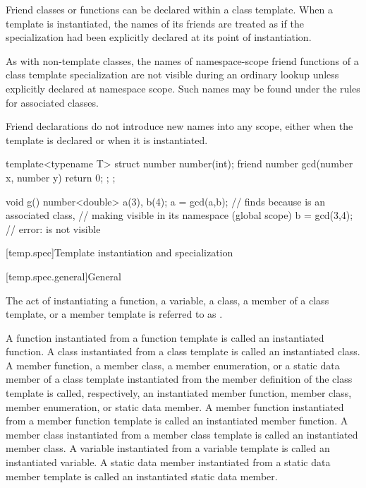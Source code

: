 \pnum
Friend classes or functions can be declared within a class template.
When a template is instantiated, the names of its friends are treated
as if the specialization had been explicitly declared at its point of
instantiation.

\pnum
As with non-template classes, the names of namespace-scope friend
functions of a class template specialization are not visible during
an ordinary lookup unless explicitly declared at namespace scope.
Such names may be found under the rules for associated
classes.
\begin{footnote}
Friend declarations do not
introduce new names into any scope, either
when the template is declared or when it is instantiated.
\end{footnote}
\begin{example}
\begin{codeblock}
template<typename T> struct number {
  number(int);
  friend number gcd(number x, number y) { return 0; };
};

void g() {
  number<double> a(3), b(4);
  a = gcd(a,b);     // finds  because  is an associated class,
                    // making  visible in its namespace (global scope)
  b = gcd(3,4);     // error:  is not visible
}
\end{codeblock}
\end{example}

[temp.spec]{Template instantiation and specialization}

[temp.spec.general]{General}

\pnum
{}%
The act of instantiating a function, a variable,
a class, a member of a class template, or
a member template is referred to as
.

\pnum
A function instantiated from a function template is called an instantiated
function.
A class instantiated from a class template is called an instantiated class.
A member function, a member class, a member enumeration, or a static data member of a class template
instantiated from the member definition of the class template is called,
respectively, an instantiated member function, member class, member enumeration, or static data
member.
A member function instantiated from a member function template is called an
instantiated member function.
A member class instantiated from a member class template is called an
instantiated member class.
A variable instantiated from a variable template is called an
instantiated variable.
A static data member instantiated from a static data member template
is called an instantiated static data member.

